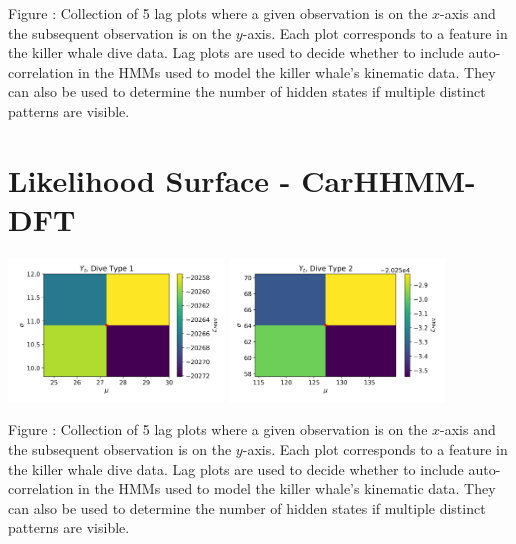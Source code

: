 \documentclass{article}
\begin{document}
        \noindent Figure : Collection of 5 lag plots where a given observation is on the $x$-axis and the subsequent observation is on the $y$-axis. Each plot corresponds to a feature in the killer whale dive data. Lag plots are used to decide whether to include auto-correlation in the HMMs used to model the killer whale's kinematic data. They can also be used to determine the number of hidden states if multiple distinct patterns are visible. 
        \addtocounter{fignum}{1}
        
        \newpage
        
    \section{Likelihood Surface - CarHHMM-DFT}
    
        \begin{center}
        \includegraphics[width=2.25in]{../Plots/2019/20190902-182840-CATs_OB_1_0_267_CarHHMM2_coarse-theta-likelihood-dive_duration-1.png}
        \includegraphics[width=2.25in]{../Plots/2019/20190902-182840-CATs_OB_1_0_267_CarHHMM2_coarse-theta-likelihood-dive_duration-2.png}
        \end{center}
        
        \noindent Figure : Collection of 5 lag plots where a given observation is on the $x$-axis and the subsequent observation is on the $y$-axis. Each plot corresponds to a feature in the killer whale dive data. Lag plots are used to decide whether to include auto-correlation in the HMMs used to model the killer whale's kinematic data. They can also be used to determine the number of hidden states if multiple distinct patterns are visible. 
        \addtocounter{fignum}{1}
        
\end{document}

